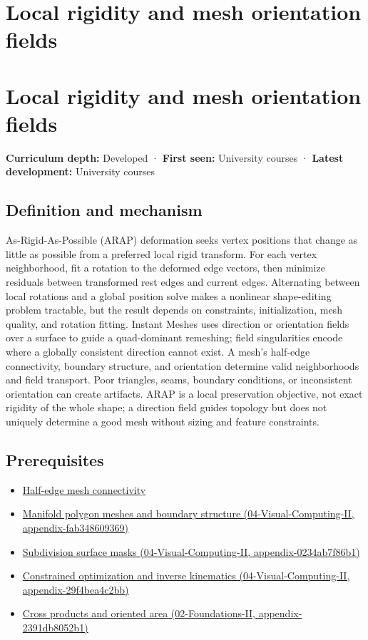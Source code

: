 \hypertarget{appendix-7107009c505b}{}
\section*{Local rigidity and mesh orientation fields}
\section{Local rigidity and mesh orientation fields}\label{local-rigidity-and-mesh-orientation-fields}

\textbf{Curriculum depth:} Developed · \textbf{First seen:} University courses · \textbf{Latest development:} University courses

\subsection{Definition and mechanism}\label{definition-and-mechanism}

As-Rigid-As-Possible (ARAP) deformation seeks vertex positions that change as little as possible from a preferred local rigid transform. For each vertex neighborhood, fit a rotation to the deformed edge vectors, then minimize residuals between transformed rest edges and current edges. Alternating between local rotations and a global position solve makes a nonlinear shape-editing problem tractable, but the result depends on constraints, initialization, mesh quality, and rotation fitting. Instant Meshes uses direction or orientation fields over a surface to guide a quad-dominant remeshing; field singularities encode where a globally consistent direction cannot exist. A mesh's half-edge connectivity, boundary structure, and orientation determine valid neighborhoods and field transport. Poor triangles, seams, boundary conditions, or inconsistent orientation can create artifacts. ARAP is a local preservation objective, not exact rigidity of the whole shape; a direction field guides topology but does not uniquely determine a good mesh without sizing and feature constraints.

\subsection{Prerequisites}\label{prerequisites}

\begin{itemize}
\tightlist
\item
  \hyperref[appendix-1aea26b2307f]{Half-edge mesh connectivity}
\item
  \href{}{Manifold polygon meshes and boundary structure (04-Visual-Computing-II, appendix-fab348609369)}
\item
  \href{}{Subdivision surface masks (04-Visual-Computing-II, appendix-0234ab7f86b1)}
\item
  \href{}{Constrained optimization and inverse kinematics (04-Visual-Computing-II, appendix-29f4bea4c2bb)}
\item
  \href{}{Cross products and oriented area (02-Foundations-II, appendix-2391db8052b1)}
\end{itemize}

